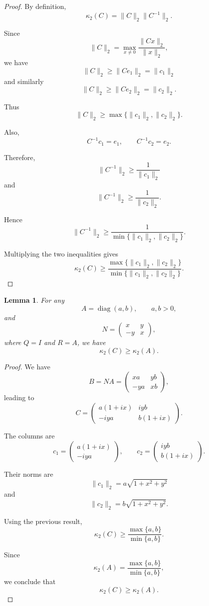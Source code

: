\documentclass[11pt, reqno, a4paper]{amsart}
\theoremstyle{plain}
\newtheorem{lemma}[theorem]{Lemma}
\theoremstyle{definition}
\theoremstyle{remark}
\numberwithin{equation}{section}
\begin{document}
\begin{proof}
By definition,
\[
\kappa_2(C)=\|C\|_2\|C^{-1}\|_2.
\]

Since
\[
\|C\|_2
=
\max_{x\neq0}
\frac{\|Cx\|_2}{\|x\|_2},
\]
we have
\[
\|C\|_2\geq\|Ce_1\|_2=\|c_1\|_2
\]
and similarly
\[
\|C\|_2\geq\|Ce_2\|_2=\|c_2\|_2.
\]

Thus
\[
\|C\|_2\geq
\max\{\|c_1\|_2,\|c_2\|_2\}.
\]

Also,
\[
C^{-1}c_1=e_1,
\qquad
C^{-1}c_2=e_2.
\]

Therefore,
\[
\|C^{-1}\|_2
\geq
\frac{1}{\|c_1\|_2}
\]
and
\[
\|C^{-1}\|_2
\geq
\frac{1}{\|c_2\|_2}.
\]

Hence
\[
\|C^{-1}\|_2
\geq
\frac{1}{\min\{\|c_1\|_2,\|c_2\|_2\}}.
\]

Multiplying the two inequalities gives
\[
\boxed{
\kappa_2(C)
\geq
\frac{\max\{\|c_1\|_2,\|c_2\|_2\}}
{\min\{\|c_1\|_2,\|c_2\|_2\}}.
}
\]
\end{proof}

\begin{lemma}
For any
\[
A=\operatorname{diag}(a,b),
\qquad a,b>0,
\]
and
\[
N=
\begin{pmatrix}
x&y\\
-y&x
\end{pmatrix},
\]
where $Q=I$ and $R=A$, we have
\[
\kappa_2(C)\geq\kappa_2(A).
\]
\end{lemma}

\begin{proof}
We have
\[
B=NA
=
\begin{pmatrix}
xa&yb\\
-ya&xb
\end{pmatrix},
\]
leading to
\[
C=
\begin{pmatrix}
a(1+ix)&iyb\\
-iya&b(1+ix)
\end{pmatrix}.
\]

The columns are
\[
c_1=
\begin{pmatrix}
a(1+ix)\\
-iya
\end{pmatrix},
\qquad
c_2=
\begin{pmatrix}
iyb\\
b(1+ix)
\end{pmatrix}.
\]

Their norms are
\[
\|c_1\|_2=a\sqrt{1+x^2+y^2}
\]
and
\[
\|c_2\|_2=b\sqrt{1+x^2+y^2}.
\]

Using the previous result,
\[
\kappa_2(C)
\geq
\frac{\max\{a,b\}}{\min\{a,b\}}.
\]

Since
\[
\kappa_2(A)=\frac{\max\{a,b\}}{\min\{a,b\}},
\]
we conclude that
\[
\boxed{\kappa_2(C)\geq\kappa_2(A).}
\]
\end{proof}
\end{document}
